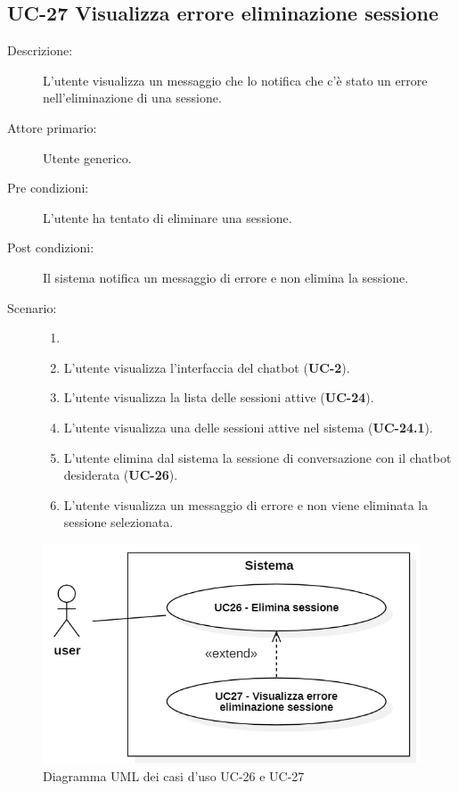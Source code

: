 \subsection{UC-27 Visualizza errore eliminazione sessione }
\begin{description}
    \item[Descrizione:] L'utente visualizza un messaggio che lo notifica che c'è stato un errore nell'eliminazione di una sessione.
    \item[Attore primario:] Utente generico.
    \item[Pre condizioni:] L'utente ha tentato di eliminare una sessione.
    \item[Post condizioni:] Il sistema notifica un messaggio di errore e non elimina la sessione.
    \item[Scenario:] 
    \begin{enumerate}
        \item[] 
        \item L’utente visualizza l'interfaccia del chatbot (\textbf{UC-2}).
        \item L'utente visualizza la lista delle sessioni attive (\textbf{UC-24}).
        \item L'utente visualizza una delle sessioni attive nel sistema (\textbf{UC-24.1}).
        \item L'utente elimina dal sistema la sessione di conversazione con il chatbot desiderata (\textbf{UC-26}).
        \item L'utente visualizza un messaggio di errore e non viene eliminata la sessione selezionata.
    \end{enumerate}
\end{description}

\begin{figure}[H]
    \centering
    \includegraphics[width=0.9\linewidth]{UC26-27.PNG}
    \caption{Diagramma UML dei casi d'uso UC-26 e UC-27}
    \label{fig:UC26-27}
\end{figure}

